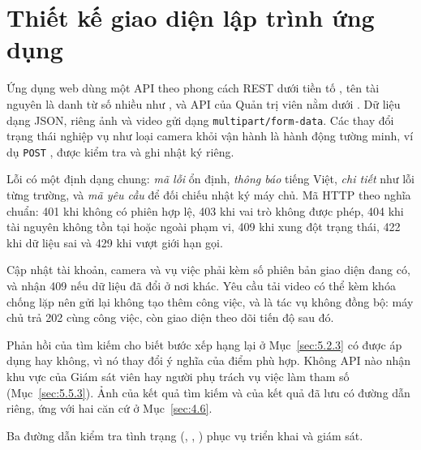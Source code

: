 \section{Thiết kế giao diện lập trình ứng dụng}
\label{sec:5.4}

Ứng dụng web dùng một API theo phong cách REST dưới tiền tố , tên tài nguyên là danh từ số nhiều như , và API của Quản trị viên nằm dưới . Dữ liệu dạng JSON, riêng ảnh và video gửi dạng \texttt{multipart/form-data}. Các thay đổi trạng thái nghiệp vụ như loại camera khỏi vận hành là hành động tường minh, ví dụ \texttt{POST} , được kiểm tra và ghi nhật ký riêng.

Lỗi có một định dạng chung: \emph{mã lỗi} ổn định, \emph{thông báo} tiếng Việt, \emph{chi tiết} như lỗi từng trường, và \emph{mã yêu cầu} để đối chiếu nhật ký máy chủ. Mã HTTP theo nghĩa chuẩn: 401 khi không có phiên hợp lệ, 403 khi vai trò không được phép, 404 khi tài nguyên không tồn tại hoặc ngoài phạm vi, 409 khi xung đột trạng thái, 422 khi dữ liệu sai và 429 khi vượt giới hạn gọi.

Cập nhật tài khoản, camera và vụ việc phải kèm số phiên bản giao diện đang có, và nhận 409 nếu dữ liệu đã đổi ở nơi khác. Yêu cầu tải video có thể kèm khóa chống lặp nên gửi lại không tạo thêm công việc, và là tác vụ không đồng bộ: máy chủ trả 202 cùng công việc, còn giao diện theo dõi tiến độ sau đó.

Phản hồi của tìm kiếm cho biết bước xếp hạng lại ở Mục~\ref{sec:5.2.3} có được áp dụng hay không, vì nó thay đổi ý nghĩa của điểm phù hợp. Không API nào nhận khu vực của Giám sát viên hay người phụ trách vụ việc làm tham số (Mục~\ref{sec:5.5.3}). Ảnh của kết quả tìm kiếm và của kết quả đã lưu có đường dẫn riêng, ứng với hai căn cứ ở Mục~\ref{sec:4.6}.

Ba đường dẫn kiểm tra tình trạng (, , ) phục vụ triển khai và giám sát.
